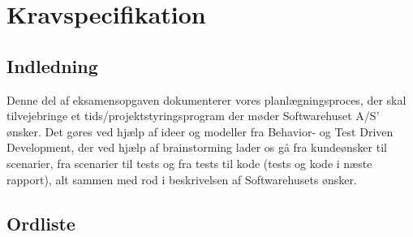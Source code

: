 \section{Kravspecifikation}
\subsection{Indledning}
Denne del af eksamensopgaven dokumenterer vores planlægningsproces, der skal tilvejebringe et tids/projektstyringsprogram der møder Softwarehuset A/S' ønsker. Det gøres ved hjælp af ideer og modeller fra Behavior- og Test Driven Development, der ved hjælp af brainstorming lader os gå fra kundeønsker til scenarier, fra scenarier til tests og fra tests til kode (tests og kode i næste rapport), alt sammen med rod i beskrivelsen af Softwarehusets ønsker. 
\subsection{Ordliste}
